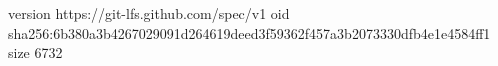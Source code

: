 version https://git-lfs.github.com/spec/v1
oid sha256:6b380a3b4267029091d264619deed3f59362f457a3b2073330dfb4e1e4584ff1
size 6732
